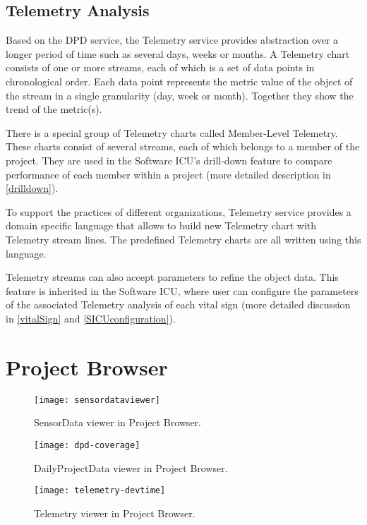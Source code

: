 \subsection{Telemetry Analysis}
Based on the DPD service, the Telemetry service provides abstraction over a longer period of time such as several days, weeks or months. A Telemetry chart consists of one or more streams, each of which is a set of data points in chronological order. Each data point represents the metric value of the object of the stream in a single granularity (day, week or month). Together they show the trend of the metric(s).

There is a special group of Telemetry charts called Member-Level Telemetry. These charts consist of several streams, each of which belongs to a member of the project. They are used in the Software ICU's drill-down feature to compare performance of each member within a project (more detailed description in \autoref{drilldown}).

To support the practices of different organizations, Telemetry service provides a domain specific language that allows to build new Telemetry chart with Telemetry stream lines. The predefined Telemetry charts are all written using this language.

Telemetry streams can also accept parameters to refine the object data. This feature is inherited in the Software ICU, where user can configure the parameters of the associated Telemetry analysis of each vital sign (more detailed discussion in \autoref{vitalSign} and \autoref{SICUconfiguration}).

\section {Project Browser}
\begin{figure}[htbp] %
   \centering
   \texttt{[image: sensordataviewer]}
   \caption{SensorData viewer in Project Browser.}
   \label{fig:sensordata}
\end{figure}

\begin{figure}[htbp] %
   \centering
   \texttt{[image: dpd-coverage]}
   \caption{DailyProjectData viewer in Project Browser.}
   \label{fig:dpd}
\end{figure}

\begin{figure}[htbp] %
   \centering
   \texttt{[image: telemetry-devtime]}
   \caption{Telemetry viewer in Project Browser.}
   \label{fig:telemetry}
\end{figure}

